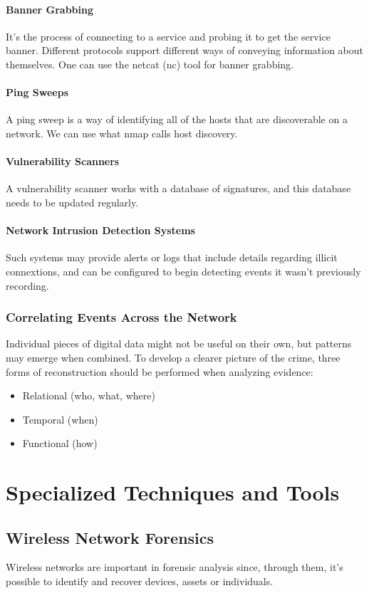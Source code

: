 \documentclass[10pt,a4paper]{report}
\begin{document}
\subsubsection{Banner Grabbing}
It’s the process of connecting to a service and probing it to get the service banner. Different protocols support different ways of conveying information about themselves. One can use the netcat (nc) tool for banner grabbing.
\subsubsection{Ping Sweeps}
A ping sweep is a way of identifying all of the hosts that are discoverable on a network. We can use what nmap calls host discovery.
\subsubsection{Vulnerability Scanners}
A vulnerability scanner works with a database of signatures, and this database needs to be updated regularly.
\subsubsection{Network Intrusion Detection Systems}
Such systems may provide alerts or logs that include details regarding illicit connextions, and can be configured to begin detecting events it wasn’t previously recording.
\subsection{Correlating Events Across the Network}
Individual pieces of digital data might not be useful on their own, but patterns may emerge when combined. To develop a clearer picture of the crime, three forms of reconstruction should be performed when analyzing evidence:
\begin{itemize}
\item Relational (who, what, where)
\item Temporal (when)
\item Functional (how)
\end{itemize}

\chapter{Specialized Techniques and Tools}
\section{Wireless Network Forensics}
Wireless networks are important in forensic analysis since, through them, it's possible to identify and recover devices, assets or individuals.
\end{document}
